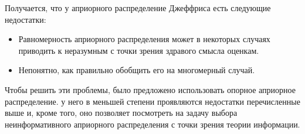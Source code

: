 Получается, что у априорного распределение Джеффриса есть следующие недостатки:
\begin{itemize}
	\item Равномерность априорного распределения может в некоторых случаях приводить к неразумным с точки зрения здравого смысла оценкам.
	\item Непонятно, как правильно обобщить его на многомерный случай.
\end{itemize}

Чтобы решить эти проблемы, было предложено использовать опорное априорное распределение.
у него в меньшей степени проявляются недостатки перечисленные выше и, кроме того, оно позволяет посмотреть на задачу выбора неинформативного априорного распределения с точки зрения теории информации.